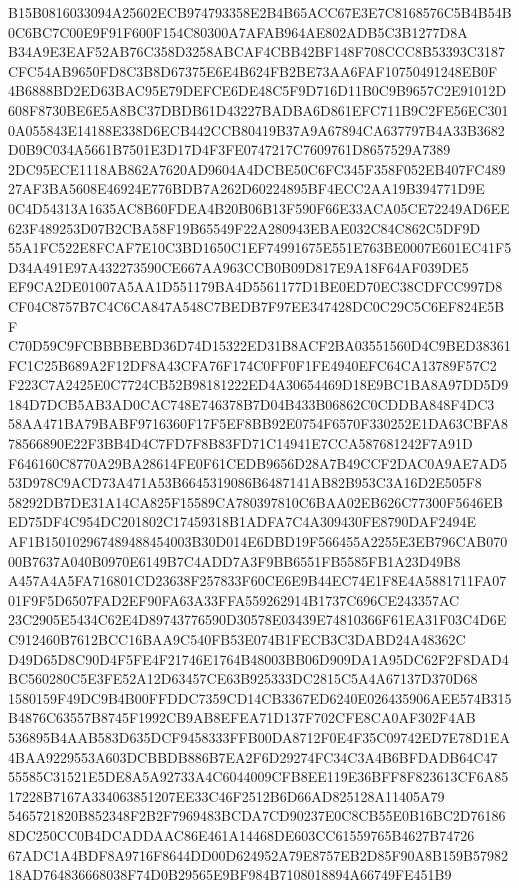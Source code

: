 \documentclass[UTF8,fontset=fandol,zihao=-4,a4paper]{ctexart}
\begin{document}
{{B15B0816033094A25602ECB974793358E2B4B65ACC67E3E7C8168576C5B4B54B0C6BC7C00E9F91F600F154C80300A7AFAB964AE802ADB5C3B1277D8A
B34A9E3EAF52AB76C358D3258ABCAF4CBB42BF148F708CCC8B53393C3187CFC54AB9650FD8C3B8D67375E6E4B624FB2BE73AA6FAF10750491248EB0F
4B6888BD2ED63BAC95E79DEFCE6DE48C5F9D716D11B0C9B9657C2E91012D608F8730BE6E5A8BC37DBDB61D43227BADBA6D861EFC711B9C2FE56EC301
0A055843E14188E338D6ECB442CCB80419B37A9A67894CA637797B4A33B3682D0B9C034A5661B7501E3D17D4F3FE0747217C7609761D8657529A7389
2DC95ECE1118AB862A7620AD9604A4DCBE50C6FC345F358F052EB407FC48927AF3BA5608E46924E776BDB7A262D60224895BF4ECC2AA19B394771D9E
0C4D54313A1635AC8B60FDEA4B20B06B13F590F66E33ACA05CE72249AD6EE623F489253D07B2CBA58F19B65549F22A280943EBAE032C84C862C5DF9D
55A1FC522E8FCAF7E10C3BD1650C1EF74991675E551E763BE0007E601EC41F5D34A491E97A432273590CE667AA963CCB0B09D817E9A18F64AF039DE5
EF9CA2DE01007A5AA1D551179BA4D5561177D1BE0ED70EC38CDFCC997D8CF04C8757B7C4C6CA847A548C7BEDB7F97EE347428DC0C29C5C6EF824E5BF
C70D59C9FCBBBBEBD36D74D15322ED31B8ACF2BA03551560D4C9BED38361FC1C25B689A2F12DF8A43CFA76F174C0FF0F1FE4940EFC64CA13789F57C2
F223C7A2425E0C7724CB52B98181222ED4A30654469D18E9BC1BA8A97DD5D9184D7DCB5AB3AD0CAC748E746378B7D04B433B06862C0CDDBA848F4DC3
58AA471BA79BABF9716360F17F5EF8BB92E0754F6570F330252E1DA63CBFA878566890E22F3BB4D4C7FD7F8B83FD71C14941E7CCA587681242F7A91D
F646160C8770A29BA28614FE0F61CEDB9656D28A7B49CCF2DAC0A9AE7AD553D978C9ACD73A471A53B6645319086B6487141AB82B953C3A16D2E505F8
58292DB7DE31A14CA825F15589CA780397810C6BAA02EB626C77300F5646EBED75DF4C954DC201802C17459318B1ADFA7C4A309430FE8790DAF2494E
AF1B150102967489488454003B30D014E6DBD19F566455A2255E3EB796CAB07000B7637A040B0970E6149B7C4ADD7A3F9BB6551FB5585FB1A23D49B8
A457A4A5FA716801CD23638F257833F60CE6E9B44EC74E1F8E4A5881711FA0701F9F5D6507FAD2EF90FA63A33FFA559262914B1737C696CE243357AC
23C2905E5434C62E4D89743776590D30578E03439E74810366F61EA31F03C4D6EC912460B7612BCC16BAA9C540FB53E074B1FECB3C3DABD24A48362C
D49D65D8C90D4F5FE4F21746E1764B48003BB06D909DA1A95DC62F2F8DAD4BC560280C5E3FE52A12D63457CE63B925333DC2815C5A4A67137D370D68
1580159F49DC9B4B00FFDDC7359CD14CB3367ED6240E026435906AEE574B315B4876C63557B8745F1992CB9AB8EFEA71D137F702CFE8CA0AF302F4AB
536895B4AAB583D635DCF9458333FFB00DA8712F0E4F35C09742ED7E78D1EA4BAA9229553A603DCBBDB886B7EA2F6D29274FC34C3A4B6BFDADB64C47
55585C31521E5DE8A5A92733A4C6044009CFB8EE119E36BFF8F823613CF6A8517228B7167A334063851207EE33C46F2512B6D66AD825128A11405A79
5465721820B852348F2B2F7969483BCDA7CD90237E0C8CB55E0B16BC2D761868DC250CC0B4DCADDAAC86E461A14468DE603CC61559765B4627B74726
67ADC1A4BDF8A9716F8644DD00D624952A79E8757EB2D85F90A8B159B5798218AD764836668038F74D0B29565E9BF984B7108018894A66749FE451B9
}}
\end{document}
